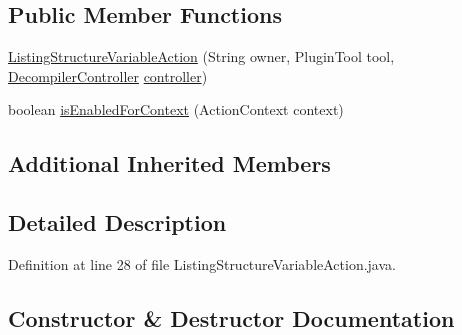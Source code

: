 \subsection*{Public Member Functions}
\begin{DoxyCompactItemize}
\item 
\mbox{\hyperlink{classghidra_1_1app_1_1plugin_1_1core_1_1decompile_1_1actions_1_1_listing_structure_variable_action_af79ea7694dfb0b4f3b232ac2555c3b9c}{Listing\+Structure\+Variable\+Action}} (String owner, Plugin\+Tool tool, \mbox{\hyperlink{classghidra_1_1app_1_1decompiler_1_1component_1_1_decompiler_controller}{Decompiler\+Controller}} \mbox{\hyperlink{classghidra_1_1app_1_1plugin_1_1core_1_1decompile_1_1actions_1_1_create_structure_variable_action_aa50d3c26a30df166fd5c8a1923ceea56}{controller}})
\item 
boolean \mbox{\hyperlink{classghidra_1_1app_1_1plugin_1_1core_1_1decompile_1_1actions_1_1_listing_structure_variable_action_a0f5a8d5621741704fa1101274dfe091f}{is\+Enabled\+For\+Context}} (Action\+Context context)
\end{DoxyCompactItemize}
\subsection*{Additional Inherited Members}


\subsection{Detailed Description}


Definition at line 28 of file Listing\+Structure\+Variable\+Action.\+java.



\subsection{Constructor \& Destructor Documentation}
\mbox{\label{classghidra_1_1app_1_1plugin_1_1core_1_1decompile_1_1actions_1_1_listing_structure_variable_action_af79ea7694dfb0b4f3b232ac2555c3b9c}} 
